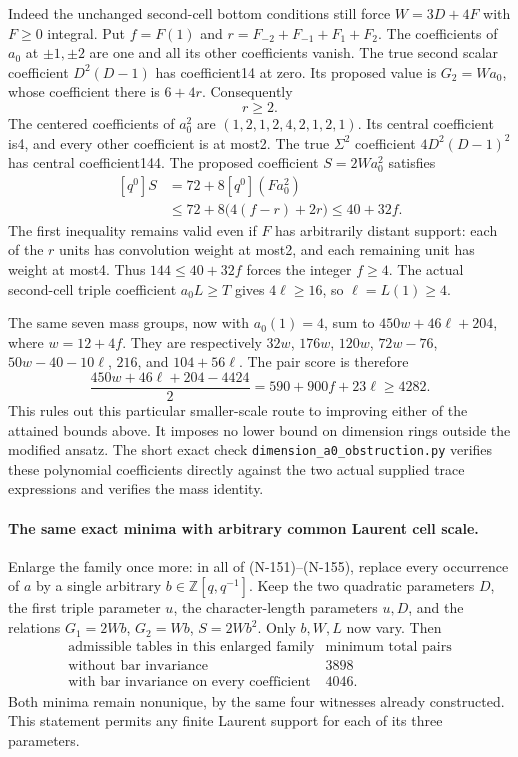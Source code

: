 Indeed the unchanged second-cell bottom conditions still force
$W=3D+4F$ with $F\ge0$ integral.  Put $f=F(1)$ and
$r=F_{-2}+F_{-1}+F_1+F_2$.
The coefficients of $a_0$ at $\pm1,\pm2$ are one and all its
other coefficients vanish.  The true second scalar coefficient
$D^2(D-1)$ has coefficient14 at zero.  Its proposed value is
$G_2=Wa_0$, whose coefficient there is $6+4r$.
Consequently
\[
                              r\ge2.
                              \tag{N-165}
\]
The centered coefficients of $a_0^2$ are
$(1,2,1,2,4,2,1,2,1)$.  Its central coefficient is4, and every
other coefficient is at most2.  The true $\Sigma^2$ coefficient
$4D^2(D-1)^2$ has central coefficient144.  The proposed coefficient
$S=2Wa_0^2$ satisfies
\[
\begin{aligned}
 [q^0]S
 &=72+8[q^0](Fa_0^2)\\
 &\le72+8\bigl(4(f-r)+2r\bigr)
 \le40+32f.
\end{aligned}\tag{N-166}
\]
The first inequality remains valid even if $F$ has arbitrarily
distant support: each of the $r$ units has convolution weight at
most2, and each remaining unit has weight at most4.
Thus $144\le40+32f$ forces the integer $f\ge4$.
The actual second-cell triple coefficient $a_0L\ge T$ gives
$4\ell\ge16$, so $\ell=L(1)\ge4$.

The same seven mass groups, now with $a_0(1)=4$, sum to
$450w+46\ell+204$, where $w=12+4f$.
They are respectively $32w$, $176w$, $120w$, $72w-76$,
$50w-40-10\ell$, $216$, and $104+56\ell$.
The pair score is therefore
\[
 \frac{450w+46\ell+204-4424}{2}
       =590+900f+23\ell\ge4282.
 \tag{N-167}
\]
This rules out this particular smaller-scale route to improving
either of the attained bounds above.  It imposes no lower bound
on dimension rings outside the modified ansatz.
The short exact check \nolinkurl{dimension_a0_obstruction.py}
verifies these polynomial coefficients directly against the two
actual supplied trace expressions and verifies the mass identity.

\paragraph{The same exact minima with arbitrary common Laurent cell scale.}
Enlarge the family once more: in all of (N-151)--(N-155), replace
every occurrence of $a$ by a single arbitrary
$b\in\mathbb Z[q,q^{-1}]$.  Keep the two quadratic parameters
$D$, the first triple parameter $u$, the character-length parameters
$u,D$, and the relations $G_1=2Wb$, $G_2=Wb$, $S=2Wb^2$.
Only $b,W,L$ now vary.  Then
\[
\begin{array}{c|c}
 \text{admissible tables in this enlarged family}&
                  \text{minimum total pairs}\\\hline
 \text{without bar invariance}&3898\\
 \text{with bar invariance on every coefficient}&4046.
\end{array}\tag{N-168}
\]
Both minima remain nonunique, by the same four witnesses already
constructed.  This statement permits any finite Laurent support
for each of its three parameters.


